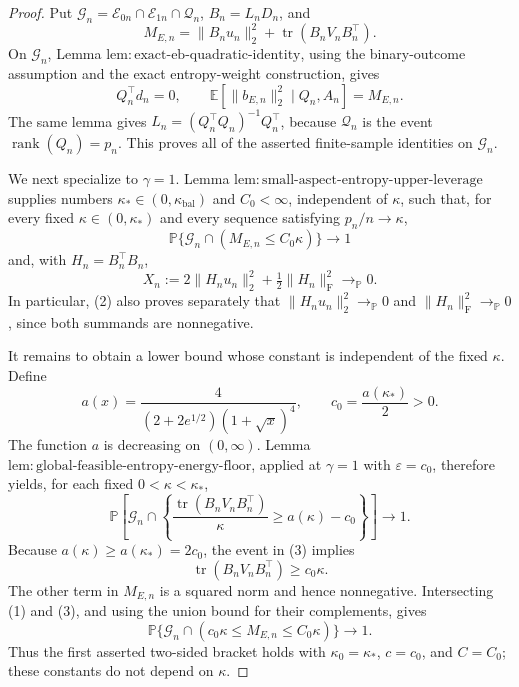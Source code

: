 \documentclass{article}
\begin{document}
\begin{proof}
Put \(\mathcal G_n=\mathcal E_{0n}\cap\mathcal E_{1n}\cap\mathcal Q_n\), \(B_n=L_nD_n\), and
\[
 M_{E,n}=\|B_nu_n\|_2^2+\operatorname{tr}(B_nV_nB_n^\top).
\]
On \(\mathcal G_n\), Lemma \(\mathrm{lem{:}exact\mbox{-}eb\mbox{-}quadratic\mbox{-}identity}\), using the binary-outcome assumption and the exact entropy-weight construction, gives
\[
 Q_n^\top d_n=0,
 \qquad
 \mathbb E\!\left[\|b_{E,n}\|_2^2\mid Q_n,A_n\right]=M_{E,n}.
\]
The same lemma gives \(L_n=(Q_n^\top Q_n)^{-1}Q_n^\top\), because \(\mathcal Q_n\) is the event \(\operatorname{rank}(Q_n)=p_n\).  This proves all of the asserted finite-sample identities on \(\mathcal G_n\).

We next specialize to \(\gamma=1\).  Lemma \(\mathrm{lem{:}small\mbox{-}aspect\mbox{-}entropy\mbox{-}upper\mbox{-}leverage}\) supplies numbers \(\kappa_*\in(0,\kappa_{\mathrm{bal}})\) and \(C_0<\infty\), independent of \(\kappa\), such that, for every fixed \(\kappa\in(0,\kappa_*)\) and every sequence satisfying \(p_n/n\to\kappa\),
\[
 \mathbb P\{\mathcal G_n\cap(M_{E,n}\le C_0\kappa)\}\longrightarrow1
 \tag{1}
\]
and, with \(H_n=B_n^\top B_n\),
\[
 X_n:=2\|H_nu_n\|_2^2+\tfrac12\|H_n\|_{\mathrm F}^2
 \longrightarrow_{\mathbb P}0.
 \tag{2}
\]
In particular, (2) also proves separately that \(\|H_nu_n\|_2^2\to_{\mathbb P}0\) and \(\|H_n\|_{\mathrm F}^2\to_{\mathbb P}0\), since both summands are nonnegative.

It remains to obtain a lower bound whose constant is independent of the fixed \(\kappa\).  Define
\[
 a(x)=\frac{4}{(2+2e^{1/2})(1+\sqrt{x})^4},
 \qquad
 c_0=\frac{a(\kappa_*)}{2}>0.
\]
The function \(a\) is decreasing on \((0,\infty)\).  Lemma \(\mathrm{lem{:}global\mbox{-}feasible\mbox{-}entropy\mbox{-}energy\mbox{-}floor}\), applied at \(\gamma=1\) with \(\varepsilon=c_0\), therefore yields, for each fixed \(0<\kappa<\kappa_*\),
\[
 \mathbb P\!\left[
  \mathcal G_n\cap
  \left\{
   \frac{\operatorname{tr}(B_nV_nB_n^\top)}{\kappa}
   \ge a(\kappa)-c_0
  \right\}
 \right]\longrightarrow1.
 \tag{3}
\]
Because \(a(\kappa)\ge a(\kappa_*)=2c_0\), the event in (3) implies
\[
 \operatorname{tr}(B_nV_nB_n^\top)\ge c_0\kappa.
\]
The other term in \(M_{E,n}\) is a squared norm and hence nonnegative.  Intersecting (1) and (3), and using the union bound for their complements, gives
\[
 \mathbb P\{\mathcal G_n\cap(c_0\kappa\le M_{E,n}\le C_0\kappa)\}
 \longrightarrow1.
 \tag{4}
\]
Thus the first asserted two-sided bracket holds with \(\kappa_0=\kappa_*\), \(c=c_0\), and \(C=C_0\); these constants do not depend on \(\kappa\).


\end{proof}
\end{document}
